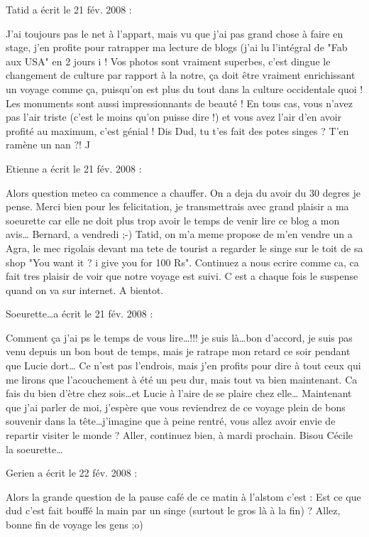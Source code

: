 \medskip
Tatid a écrit le 21 fév. 2008 :
\begin{displayquote}
J'ai toujours pas le net à l'appart, mais vu que j'ai pas grand chose à faire en stage, j'en profite pour ratrapper ma lecture de blogs (j'ai lu l'intégral de "Fab aux USA" en 2 jours ^^) !
Vos photos sont vraiment superbes, c'est dingue le changement de culture par rapport à la notre, ça doit être vraiment enrichissant un voyage comme ça, puisqu'on est plus du tout dans la culture occidentale quoi ! Les monuments sont aussi impressionnants de beauté ! En tous cas, vous n'avez pas l'air triste (c'est le moins qu'on puisse dire !) et vous avez l'air d'en avoir profité au maximum, c'est génial !
Dis Dud, tu t'es fait des potes singes ? T'en ramène un nan ?! ^^
\end{displayquote}

\medskip
Etienne a écrit le 21 fév. 2008 :
\begin{displayquote}
Alors question meteo ca commence a chauffer. On a deja du avoir du 30 degres je pense. Merci bien pour les felicitation, je transmettrais avec grand plaisir a ma soeurette car elle ne doit plus trop avoir le temps de venir lire ce blog a mon avis\dots
Bernard, a vendredi ;-)
Tatid, on m'a meme propose de m'en vendre un a Agra, le mec rigolais devant ma tete de tourist a regarder le singe sur le toit de sa shop "You want it ? i give you for 100 Rs".
Continuez a nous ecrire comme ca, ca fait tres plaisir de voir que notre voyage est suivi. C est a chaque fois le suspense quand on va sur internet. A bientot.
\end{displayquote}

\medskip
Soeurette\dots a écrit le 21 fév. 2008 :
\begin{displayquote}
Comment ça j'ai ps le temps de vous lire\dots !!! je suis là\dots bon d'accord, je suis pas venu depuis un bon bout de temps, mais je ratrape mon retard ce soir pendant que Lucie dort\dots
Ce n'est pas l'endrois, mais j'en profits pour dire à tout ceux  qui me lirons que l'acouchement à été un peu dur, mais tout va bien maintenant. Ca fais du bien d'ètre chez sois\dots et Lucie à l'aire de se plaire chez elle\dots
Maintenant que j'ai parler de moi, j'espère que vous reviendrez de ce voyage plein de bons souvenir dans la tête\dots j'imagine que à peine rentré, vous allez avoir envie de repartir visiter le monde ?
Aller, continuez bien, à mardi prochain.
Bisou
Cécile la soeurette\dots
\end{displayquote}

\medskip
Gerien a écrit le 22 fév. 2008 :
\begin{displayquote}
Alors la grande question de la pause café de ce matin à l'alstom c'est :
Est ce que dud c'est fait bouffé la main par un singe (surtout le gros là à la fin) ?
Allez, bonne fin de voyage les gens ;o)
\end{displayquote}

